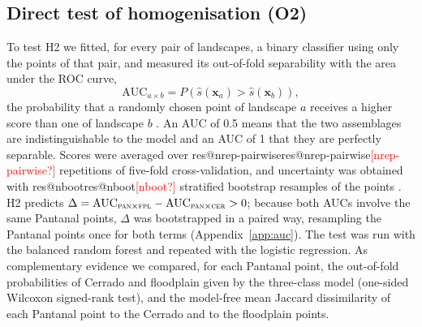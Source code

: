 \documentclass[10pt,a4paper,twocolumn]{article}
\makeatletter
\newcommand{\res}[1]{\ifcsname res@#1\endcsname\csname res@#1\endcsname\else\textcolor{red}{[#1?]}\fi}
\newcommand{\Fpl}{\textsc{fpl}}
\newcommand{\Pan}{\textsc{pan}}
\newcommand{\Cer}{\textsc{cer}}
\newcommand{\AUC}{\mathrm{AUC}}
\makeatother
\begin{document}
\subsection{Direct test of homogenisation (O2)}\label{sec:mhomog}
To test H2 we fitted, for every pair of landscapes, a binary classifier using only the points of
that pair, and measured its out-of-fold separability with the area under the ROC curve,
\[
\AUC_{a\times b} = P\!\left(\hat s(\mathbf{x}_a) > \hat s(\mathbf{x}_b)\right),
\]
the probability that a randomly chosen point of landscape $a$ receives a higher score than one of
landscape $b$ \citep{hanley1982}. An AUC of 0.5 means that the two assemblages are
indistinguishable to the model and an AUC of 1 that they are perfectly separable. Scores were
averaged over \res{nrep-pairwise} repetitions of five-fold cross-validation, and uncertainty was
obtained with \res{nboot} stratified bootstrap resamples of the points \citep{efron1993}. H2 predicts
$\Delta = \AUC_{\Pan\times\Fpl} - \AUC_{\Pan\times\Cer} > 0$; because both AUCs involve the same
Pantanal points, $\Delta$ was bootstrapped in a paired way, resampling the Pantanal points once for
both terms (Appendix~\ref{app:auc}). The test was run with the balanced random forest and repeated
with the logistic regression. As complementary evidence we compared, for each Pantanal point, the
out-of-fold probabilities of Cerrado and floodplain given by the three-class model (one-sided
Wilcoxon signed-rank test), and the model-free mean Jaccard dissimilarity of each Pantanal point to
the Cerrado and to the floodplain points.
\end{document}
